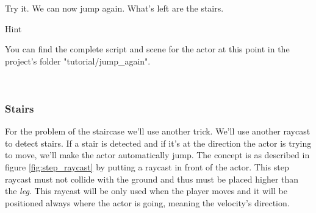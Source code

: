 \documentclass[10pt,a4paper]{article}
\newenvironment{hint}{%
\begin{bclogo}[logo=\bcinfo, couleurBarre=Green, noborder=true, 
               couleur=white]{Hint}
}{%
\end{bclogo}\hspace{1px}\\
}
\begin{document}
Try it. We can now jump again. What's left are the stairs.

\begin{hint}
You can find the complete script and scene for the actor at this point in the project's folder "tutorial/jump\_again".
\end{hint}

\subsubsection{Stairs}
For the problem of the staircase we'll use another trick. We'll use another raycast to detect stairs. If a stair is detected and if it's at the direction the actor is trying to move, we'll make the actor automatically jump. The concept is as described in figure \ref{fig:step_raycast} by putting a raycast in front of the actor. This step raycast must not collide with the ground and thus must be placed higher than the \textit{leg}. This raycast will be only used when the player moves and it will be positioned always where the actor is going, meaning the velocity's direction.
\end{document}
